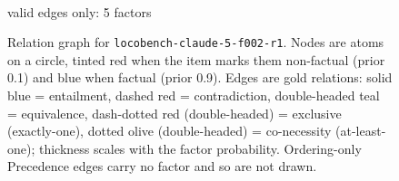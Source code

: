 \documentclass[11pt]{article}
\begin{document}
\begin{figure}[htbp]
\begin{minipage}[t]{0.48\linewidth}
{
}
\\[2pt]{\footnotesize valid edges only: 5 factors}
\end{minipage}
\caption{Relation graph for \texttt{locobench-claude-5-f002-r1}. Nodes are atoms on a circle, tinted red when the item marks them non-factual (prior 0.1) and blue when factual (prior 0.9). Edges are gold relations: solid blue = entailment, dashed red = contradiction, double-headed teal = equivalence, dash-dotted red (double-headed) = exclusive (exactly-one), dotted olive (double-headed) = co-necessity (at-least-one); thickness scales with the factor probability. Ordering-only Precedence edges carry no factor and so are not drawn.}
\label{fig:graph-locobench-claude-5-f002-r1}
\end{figure}
\end{document}
